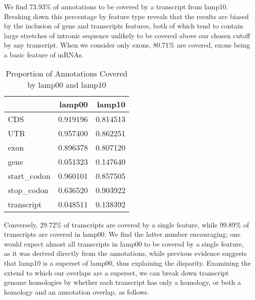 \documentclass[10pt,twocolumn,linenumbers]{article}
\begin{document}
We find 73.93\%
 of annotations to be covered by a
transcript from lamp10. Breaking down this percentage by feature type reveals that the results are 
biased by the inclusion of gene and transcripts features, both of which tend to contain large stretches 
of intronic sequence unlikely to be covered above our chosen cutoff by any transcript. When we consider 
only exons, 80.71\%
 are covered, 
exons being a basic feature of mRNAs.

\begin{table*}[t]
\caption {Proportion of Annotations Covered by lamp00 and lamp10}
\begin{center}

\begin{tabular}{lrr}
\toprule
{} &    lamp00 &    lamp10 \\
\midrule
CDS         &  0.919196 &  0.814513 \\
UTR         &  0.957400 &  0.862251 \\
exon        &  0.896378 &  0.807120 \\
gene        &  0.051323 &  0.147640 \\
start\_codon &  0.960101 &  0.857505 \\
stop\_codon  &  0.636520 &  0.903922 \\
transcript  &  0.048511 &  0.138392 \\
\bottomrule
\end{tabular}



\end{center}
\end{table*}

Conversely, 29.72\%
 of transcripts are 
covered by a single feature, while 99.89\%
 of 
transcripts are covered in lamp00. We find the latter number encouraging; one would expect almost 
all transcripts in lamp00 to be covered by a single feature, as it was derived directly from the 
annotations, while previous evidence suggests that lamp10 is a superset of lamp00, thus explaining 
the disparity. Examining the extend to which our overlaps are a superset, we can break down transcript 
genome homologies by whether each transcript has only a homology, or both a homology and an annotation 
overlap, as follows.
\end{document}

